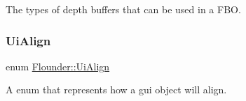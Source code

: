 The types of depth buffers that can be used in a F\+BO. 

\mbox{\label{namespace_flounder_a561db2012ae4152be62bcd882407d361}} 
\subsubsection{\texorpdfstring{Ui\+Align}{UiAlign}}
{\footnotesize\ttfamily enum \hyperlink{namespace_flounder_a561db2012ae4152be62bcd882407d361}{Flounder\+::\+Ui\+Align}}



A enum that represents how a gui object will align. 

